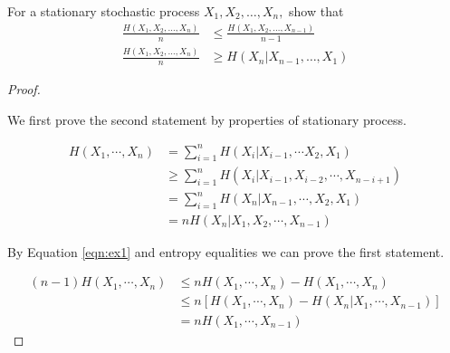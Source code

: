 \begin{exercise}{For a stationary stochastic process $X_{1}, X_{2}, \ldots, X_{n},$ show that
  $$
  \begin{aligned}
  \frac{H\left(X_{1}, X_{2}, \ldots, X_{n}\right)}{n} & \leq \frac{H\left(X_{1}, X_{2}, \ldots, X_{n-1}\right)}{n-1} \\
  \frac{H\left(X_{1}, X_{2}, \ldots, X_{n}\right)}{n} & \geq H\left(X_{n} | X_{n-1}, \ldots, X_{1}\right)
  \end{aligned}
  $$}
  \begin{proof}
  \par{~}

  We first prove the second statement by properties of stationary process.

  \begin{equation}\begin{aligned}
    H\left(X_{1}, \cdots, X_{n}\right) &=\sum_{i=1}^{n} H\left(X_{i} | X_{i-1}, \cdots X_{2}, X_{1}\right) \\
    & \geqslant \sum_{i=1}^{n} H\left(X_{i} | X_{i-1}, X_{i-2}, \cdots, X_{n-i+1}\right) \\
    &=\sum_{i=1}^{n} H\left(X_{n} | X_{n-1}, \cdots, X_{2}, X_{1}\right) \\
    &=n H\left(X_{n} | X_{1}, X_{2}, \cdots, X_{n-1}\right)
    \end{aligned}\label{eqn:ex1}\end{equation}

    By Equation \ref{eqn:ex1} and entropy equalities we can prove the first statement.

  \begin{equation}\begin{aligned}
    (n-1) H\left(X_{1}, \cdots, X_{n}\right) & \leqslant n H\left(X_{1}, \cdots, X_{n}\right)-H\left(X_{1}, \cdots, X_{n}\right) \\
    & \leqslant n\left[H\left(X_{1}, \cdots, X_{n}\right)-H\left(X_{n}|X_{1}, \cdots, X_{n-1}\right)\right]\\
    &=n H\left(X_{1}, \cdots, X_{n-1}\right)
    \end{aligned}\end{equation}


  \end{proof}
  \label{ex1}
\end{exercise}

